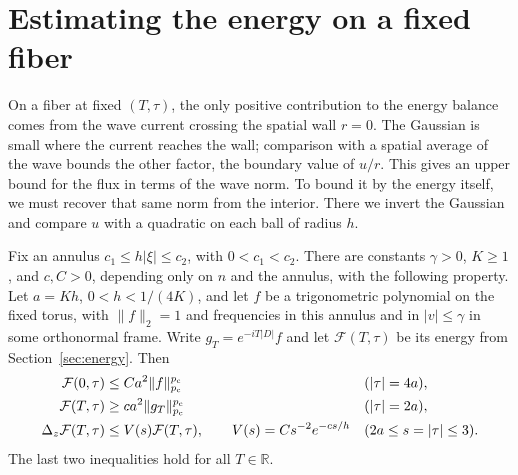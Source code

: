 \section{Estimating the energy on a fixed fiber}\label{sec:barrier}

On a fiber at fixed $(T,\tau)$, the only positive contribution to
the energy balance comes from the wave current crossing the spatial
wall $r=0$. The Gaussian is small where the current reaches the wall;
comparison with a spatial average of the wave bounds the other factor,
the boundary value of $u/r$. This gives an upper bound for the flux in
terms of the wave norm. To bound it by the energy itself, we must
recover that same norm from the interior. There we invert the Gaussian
and compare $u$ with a quadratic on each ball of radius $h$.

\begin{proposition}\label{prop:fixed-barrier}
Fix an annulus $c_1\le h|\xi|\le c_2$, with $0<c_1<c_2$. There are
constants $\gamma>0$, $K\ge1$, and $c,C>0$, depending only on $n$ and
the annulus, with the following property. Let $a=Kh$, $0<h<1/(4K)$,
and let $f$ be a trigonometric polynomial on the fixed torus, with
$\|f\|_2=1$ and frequencies in this annulus and in $|v|\le\gamma$ in
some orthonormal frame. Write $g_T=e^{-iT|D|}f$ and let
$\mathcal F(T,\tau)$ be its energy from Section~\ref{sec:energy}.
Then
\begin{align}
 \mathcal F(0,\tau)&\le C a^2\|f\|_{p_{\mathrm c}}^{p_{\mathrm c}}
       && (|\tau|=4a),\label{eq:barrier-input}\\
 \mathcal F(T,\tau)&\ge c a^2\|g_T\|_{p_{\mathrm c}}^{p_{\mathrm c}}
       && (|\tau|=2a),\label{eq:barrier-output}\\
 \Delta_z\mathcal F(T,\tau)&\le V(s)\mathcal F(T,\tau),\qquad
   V(s)=C s^{-2}e^{-c s/h}
       && (2a\le s=|\tau|\le3).\label{eq:barrier-potential}
\end{align}
The last two inequalities hold for all $T\in\mathbb R$.
\end{proposition}

